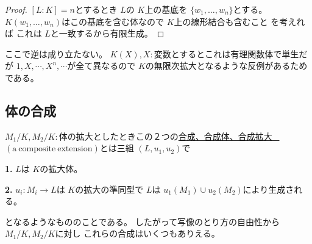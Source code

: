\documentclass[../master_galois_theory]{subfiles}
\begin{document}
\begin{proof}
  $[L:K] = n$とするとき
  $L$の $K$上の基底を $\{ w_1 , \dots , w_n \}$とする。
  $K(w_1 , \dots , w_n)$はこの基底を含む体なので $K$上の線形結合も含むこと
  を考えれば
  これは $L$と一致するから有限生成。
\end{proof}

ここで逆は成り立たない。
$K(X) , X:$変数とするとこれは有理関数体で単生だが
$1 , X , \cdots , X^n , \cdots$が全て異なるので
$K$の無限次拡大となるような反例があるためである。

\subsection{体の合成}

\begin{defi}
  $M_1/K , M_2/K:$体の拡大としたときこの２つの\underline{合成、合成体、合成拡大 \  $(\mathrm{a \  composite \  extension})$}とは三組 $(L,u_1,u_2)$で

  \textbf{1.}
  $L$は $K$の拡大体。

  \textbf{2.}
  $u_i : M_i \longrightarrow L$は $K$の拡大の準同型で
  $L$は $u_1(M_1) \cup u_2(M_2)$により生成される。

  となるようなもののことである。
  したがって写像のとり方の自由性から $M_1/K , M_2/K$に対し
  これらの合成はいくつもありえる。
\end{defi}

\clearpage
\end{document}
